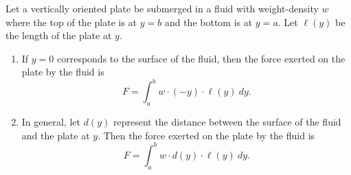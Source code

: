 {Let a vertically oriented plate be submerged in a fluid with weight-density $w$ where the top of the plate is at $y=b$ and the bottom is at $y=a$. Let $\ell(y)$ be the length of the plate at $y$.
\begin{enumerate}
	\item	If $y=0$ corresponds to the surface of the fluid, then the force exerted on the plate by the fluid is
	\[F=\int_a^b w\cdot(-y)\cdot\ell(y)\ dy.\]
	\item	In general, let $d(y)$ represent the distance between the surface of the fluid and the plate at $y$. Then the force exerted on the plate by the fluid is 
	\[F=\int_a^b w\cdot d(y)\cdot\ell(y)\ dy.\]
\end{enumerate}}

